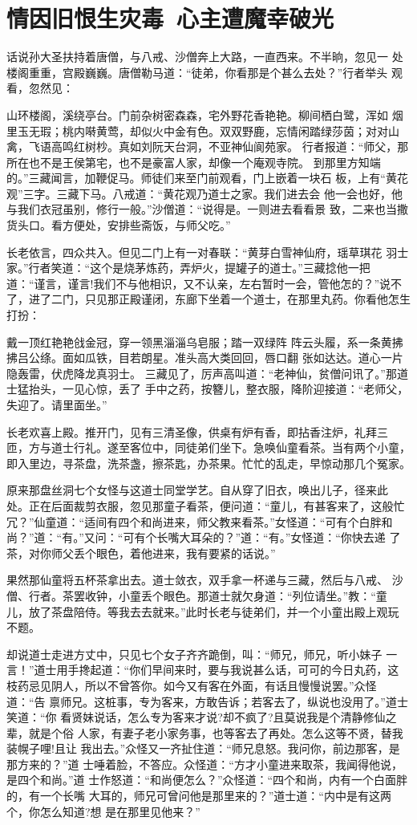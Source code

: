 \chapter{情因旧恨生灾毒~心主遭魔幸破光}

话说孙大圣扶持着唐僧，与八戒、沙僧奔上大路，一直西来。不半晌，忽见一
处楼阁重重，宫殿巍巍。唐僧勒马道：“徒弟，你看那是个甚么去处？”行者举头
观看，忽然见：

山环楼阁，溪绕亭台。门前杂树密森森，宅外野花香艳艳。柳间栖白鹭，浑如
烟里玉无瑕；桃内啭黄莺，却似火中金有色。双双野鹿，忘情闲踏绿莎茵；对对山
禽，飞语高鸣红树杪。真如刘阮天台洞，不亚神仙阆苑家。
行者报道：“师父，那所在也不是王侯第宅，也不是豪富人家，却像一个庵观寺院。
到那里方知端的。”三藏闻言，加鞭促马。师徒们来至门前观看，门上嵌着一块石
板，上有“黄花观”三字。三藏下马。八戒道：“黄花观乃道士之家。我们进去会
他一会也好，他与我们衣冠虽别，修行一般。”沙僧道：“说得是。一则进去看看景
致，二来也当撒货头口。看方便处，安排些斋饭，与师父吃。”

长老依言，四众共入。但见二门上有一对春联：“黄芽白雪神仙府，瑶草琪花
羽士家。”行者笑道：“这个是烧茅炼药，弄炉火，提罐子的道士。”三藏捻他一把
道：“谨言，谨言!我们不与他相识，又不认亲，左右暂时一会，管他怎的？”说不
了，进了二门，只见那正殿谨闭，东廊下坐着一个道士，在那里丸药。你看他怎生
打扮：

戴一顶红艳艳戗金冠，穿一领黑淄淄乌皂服；踏一双绿阵
阵云头履，系一条黄拂拂吕公绦。面如瓜铁，目若朗星。准头高大类回回，唇口翻
张如达达。道心一片隐轰雷，伏虎降龙真羽士。
三藏见了，厉声高叫道：“老神仙，贫僧问讯了。”那道士猛抬头，一见心惊，丢了
手中之药，按簪儿，整衣服，降阶迎接道：“老师父，失迎了。请里面坐。”

长老欢喜上殿。推开门，见有三清圣像，供桌有炉有香，即拈香注炉，礼拜三
匝，方与道士行礼。遂至客位中，同徒弟们坐下。急唤仙童看茶。当有两个小童，
即入里边，寻茶盘，洗茶盏，擦茶匙，办茶果。忙忙的乱走，早惊动那几个冤家。

原来那盘丝洞七个女怪与这道士同堂学艺。自从穿了旧衣，唤出儿子，径来此
处。正在后面裁剪衣服，忽见那童子看茶，便问道：“童儿，有甚客来了，这般忙
冗？”仙童道：“适间有四个和尚进来，师父教来看茶。”女怪道：“可有个白胖和
尚？”道：“有。”又问：“可有个长嘴大耳朵的？”道：“有。”女怪道：“你快去递
了茶，对你师父丢个眼色，着他进来，我有要紧的话说。”

果然那仙童将五杯茶拿出去。道士敛衣，双手拿一杯递与三藏，然后与八戒、
沙僧、行者。茶罢收钟，小童丢个眼色。那道士就欠身道：“列位请坐。”教：“童
儿，放了茶盘陪侍。等我去去就来。”此时长老与徒弟们，并一个小童出殿上观玩
不题。

却说道士走进方丈中，只见七个女子齐齐跪倒，叫：“师兄，师兄，听小妹子
一言！”道士用手搀起道：“你们早间来时，要与我说甚么话，可可的今日丸药，这
枝药忌见阴人，所以不曾答你。如今又有客在外面，有话且慢慢说罢。”众怪道：“告
禀师兄。这桩事，专为客来，方敢告诉；若客去了，纵说也没用了。”道士笑道：“你
看贤妹说话，怎么专为客来才说?却不疯了?且莫说我是个清静修仙之辈，就是个俗
人家，有妻子老小家务事，也等客去了再处。怎么这等不贤，替我装幌子哩!且让
我出去。”众怪又一齐扯住道：“师兄息怒。我问你，前边那客，是那方来的？”道
士唾着脸，不答应。众怪道：“方才小童进来取茶，我闻得他说，是四个和尚。”道
士作怒道：“和尚便怎么？”众怪道：“四个和尚，内有一个白面胖的，有一个长嘴
大耳的，师兄可曾问他是那里来的？”道士道：“内中是有这两个，你怎么知道?想
是在那里见他来？”

